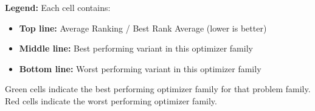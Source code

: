 \documentclass{article}
\begin{document}
\vspace{0.5em}
\textbf{Legend:} Each cell contains:
\begin{itemize}
\item \textbf{Top line:} Average Ranking / Best Rank Average (lower is better)
\item \textbf{Middle line:} Best performing variant in this optimizer family
\item \textbf{Bottom line:} Worst performing variant in this optimizer family
\end{itemize}
Green cells indicate the best performing optimizer family for that problem family.
Red cells indicate the worst performing optimizer family.
\end{document}
